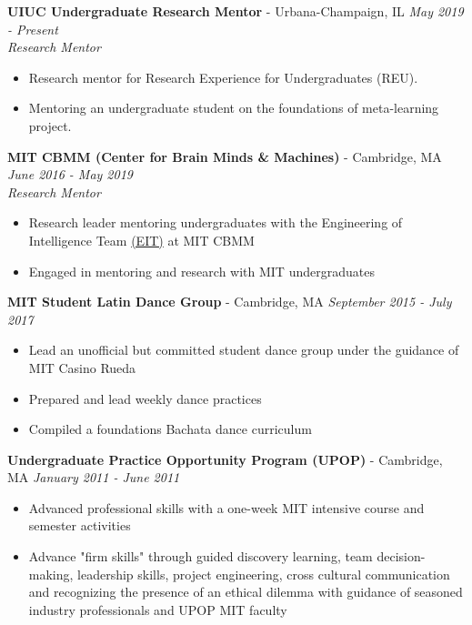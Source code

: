 \documentclass{article}
\newenvironment{changemargin}[2]{%
  \begin{list}{}{%
    \setlength{\topsep}{0pt}%
    \setlength{\leftmargin}{#1}%
    \setlength{\rightmargin}{#2}%
    \setlength{\listparindent}{\parindent}%
    \setlength{\itemindent}{\parindent}%
    \setlength{\parsep}{\parskip}%
  }%
  \item[]}{\end{list}
}
\newenvironment{body} {
	\vspace*{-16pt}
	\begin{changemargin}{-0.25in}{-0.5in}
  }	
	{\end{changemargin}
}
\begin{document}
\begin{body}
	\textbf{UIUC Undergraduate Research Mentor} - Urbana-Champaign, IL \hfill \emph{May 2019 - Present}\\
	\emph{Research Mentor}\\
	\vspace*{-3pt}
	\begin{itemize} \itemsep -2pt  %
    	\item Research mentor for Research Experience for Undergraduates (REU).
    	\item Mentoring an undergraduate student on the foundations of meta-learning project.
	\end{itemize}
	\vspace{5 pt}
	
	\textbf{MIT CBMM (Center for Brain Minds \& Machines)} - Cambridge, MA \hfill \emph{June 2016 - May 2019}\\
	\emph{Research Mentor}\\
	\vspace*{-3pt}
	\begin{itemize} \itemsep -2pt  %
    	\item Research leader mentoring undergraduates with the Engineering of Intelligence Team \href{https://cbmm.mit.edu/eit/people}{(EIT)} at MIT CBMM
        \item Engaged in mentoring and research with MIT undergraduates
	\end{itemize}
	\vspace{5 pt}
	
	\textbf{MIT Student Latin Dance Group} - Cambridge, MA \hfill \emph{September 2015 - July 2017}\\
	\vspace*{-3pt}
	\begin{itemize} \itemsep -2pt
		\item Lead an unofficial but committed student dance group under the guidance of MIT Casino Rueda
        \item Prepared and lead weekly dance practices
        \item Compiled a foundations Bachata dance curriculum
	\end{itemize}
	\vspace{5 pt}
	
	\textbf{Undergraduate Practice Opportunity Program (UPOP)} - Cambridge, MA \hfill \emph{January 2011 - June 2011}\\
	\vspace*{-3pt}
	\begin{itemize} \itemsep -2pt
		\item Advanced professional skills with a one-week MIT intensive course and semester activities
        \item Advance "firm skills" through guided discovery learning, team decision-making, leadership skills, project engineering, cross cultural communication and recognizing the presence of an ethical dilemma with guidance of seasoned industry professionals and UPOP MIT faculty
	\end{itemize}
	\vspace{5 pt}


\end{body}
\end{document}
